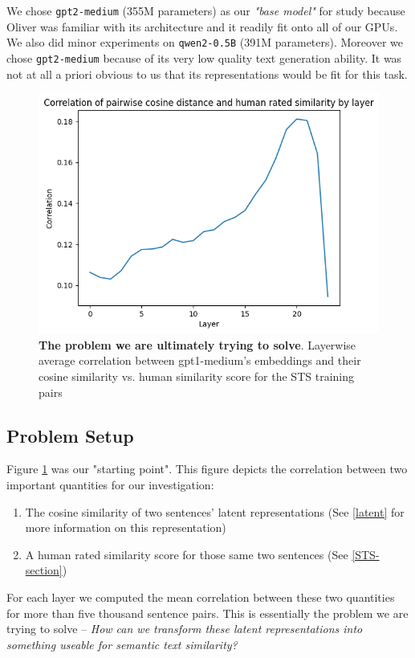 \documentclass[14pt, twocolumn]{article}
\begin{document}
We chose \verb|gpt2-medium| (355M parameters) as our \textit{"base model"} for study because Oliver was familiar with its architecture and it readily fit onto all of our GPUs. We also did minor experiments on \verb|qwen2-0.5B| (391M parameters). Moreover we chose \verb|gpt2-medium| because of its very low quality text generation ability. It was not at all a priori obvious to us that its representations would be fit for this task.

\begin{figure}[!htb]
    \centering
    \includegraphics[width=1\linewidth]{raw_cosine_sim.png}
    \caption{\textbf{The problem we are ultimately trying to solve}. Layerwise average correlation between gpt1-medium's embeddings and their cosine similarity vs. human similarity score for the STS training pairs}
    \label{fig:raw-corr}
\end{figure}

\subsection{Problem Setup} \label{Setup}
Figure \ref{fig:raw-corr} was our "starting point". This figure depicts the correlation between two important quantities for our investigation:
\begin{enumerate}
    \item The cosine similarity of two sentences' latent representations (See \ref{latent} for more information on this representation)
    \item A human rated similarity score for those same two sentences (See \ref{STS-section})
\end{enumerate}
For each layer we computed the mean correlation between these two quantities for more than five thousand sentence pairs. This is essentially the problem we are trying to solve -- \textit{How can we transform these latent representations into something useable for semantic text similarity?}
\end{document}
